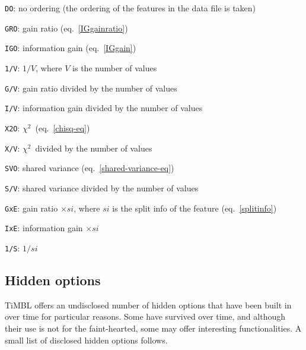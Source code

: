 \documentclass{report}
\newcommand{\chisq}{{$ \chi^2 $}}
\begin{document}
\begin{description}
	\begin{description}
         \item {\tt DO}: no ordering (the ordering of the features in
           the data file is taken)
         \item {\tt GRO}: gain ratio (eq.~\ref{IGgainratio})
         \item {\tt IGO}: information gain (eq.~\ref{IGgain})
         \item {\tt 1/V}: $1/V$, where $V$ is the number of values
         \item {\tt G/V}: gain ratio divided by the number of values
         \item {\tt I/V}: information gain divided by the number of
           values
         \item {\tt X2O}: \chisq \ (eq.~\ref{chisq-eq})
         \item {\tt X/V}: \chisq \ divided by the number of values
         \item {\tt SVO}: shared variance
           (eq.~\ref{shared-variance-eq})
         \item {\tt S/V}: shared variance divided by the number of
           values
         \item {\tt GxE}: gain ratio $\times si$, where $si$ is the
           split info of the feature (eq.~\ref{splitinfo})
         \item {\tt IxE}: information gain $\times si$
         \item {\tt 1/S}: $1/si$
	\end{description}

\end{description}

\subsection{Hidden options}

TiMBL offers an undisclosed number of hidden options that have been built in over time for particular reasons. Some have survived over time, and although their use is not for the faint-hearted, some may offer interesting functionalities. A small list of disclosed hidden options follows.
\end{document}
